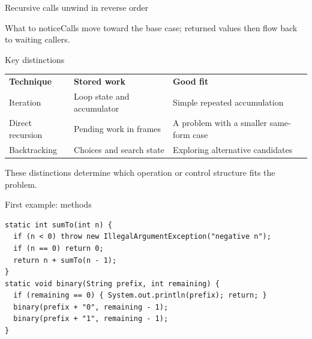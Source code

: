\documentclass[10pt,aspectratio=169]{beamer}
\begin{document}
\begin{frame}[fragile,t]{Recursive calls unwind in reverse order}
\begin{center}\end{center}
\begin{block}{What to notice}Calls move toward the base case; returned values then flow back to waiting callers.\end{block}
\end{frame}
\begin{frame}[fragile,t]{Key distinctions}
\small\renewcommand{\arraystretch}{1.5}
\begin{tabularx}{\textwidth}{>{\raggedright\arraybackslash}X>{\raggedright\arraybackslash}X>{\raggedright\arraybackslash}X}
\rowcolor{navy}
\color{white}\bfseries Technique & \color{white}\bfseries Stored work & \color{white}\bfseries Good fit\\
Iteration & Loop state and accumulator & Simple repeated accumulation\\
Direct recursion & Pending work in frames & A problem with a smaller same-form case\\
Backtracking & Choices and search state & Exploring alternative candidates\\
\end{tabularx}
\vspace{3mm}\footnotesize These distinctions determine which operation or control structure fits the problem.
\end{frame}

\begin{frame}[fragile,t]{First example: methods}
\begin{lstlisting}
static int sumTo(int n) {
  if (n < 0) throw new IllegalArgumentException("negative n");
  if (n == 0) return 0;
  return n + sumTo(n - 1);
}
static void binary(String prefix, int remaining) {
  if (remaining == 0) { System.out.println(prefix); return; }
  binary(prefix + "0", remaining - 1);
  binary(prefix + "1", remaining - 1);
}
\end{lstlisting}
\end{frame}
\end{document}
